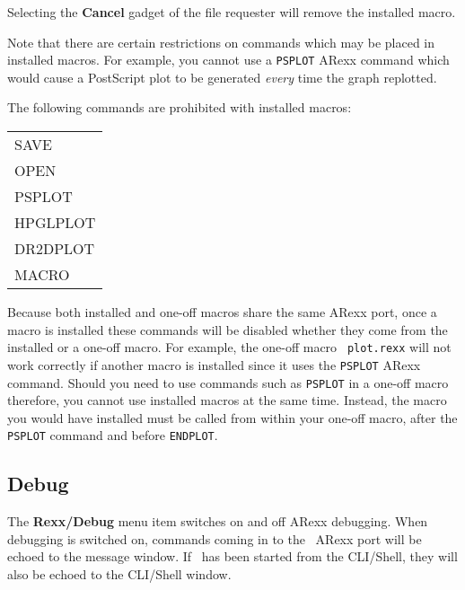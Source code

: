 Selecting the {\bf Cancel} gadget of the file requester will remove the 
installed macro.

Note that there are certain restrictions on commands which may be placed 
in installed macros. For example, you cannot use a {\tt PSPLOT} ARexx 
command which would cause a PostScript plot to be generated {\em every\/} 
time the graph replotted.

The following commands are prohibited with installed macros:
\begin{center}
\begin{tabular}{l}
SAVE     \\
OPEN     \\
PSPLOT   \\
HPGLPLOT \\
DR2DPLOT \\
MACRO    \\
\end{tabular}
\end{center}

Because both installed and one-off macros share the same ARexx port, 
once a macro is installed these commands will be disabled whether they come 
from the installed or a one-off macro. For example, the one-off macro {\tt
plot.rexx} will not work correctly if another macro is installed since it uses 
the {\tt PSPLOT} ARexx command. Should you need to use commands such as 
{\tt PSPLOT} in a one-off macro therefore, you cannot use installed 
macros at the same time. Instead, the macro you would have installed 
must be called from within your one-off macro, after the {\tt PSPLOT} command and 
before {\tt ENDPLOT}.

\subsection{Debug}
The {\bf Rexx/Debug} menu item switches on and off ARexx debugging. When 
debugging is switched on, commands coming in to the \amplot\ ARexx port 
will be echoed to the message window. If \amplot\ has been started from
the CLI/Shell, they will also be echoed to the CLI/Shell window.


